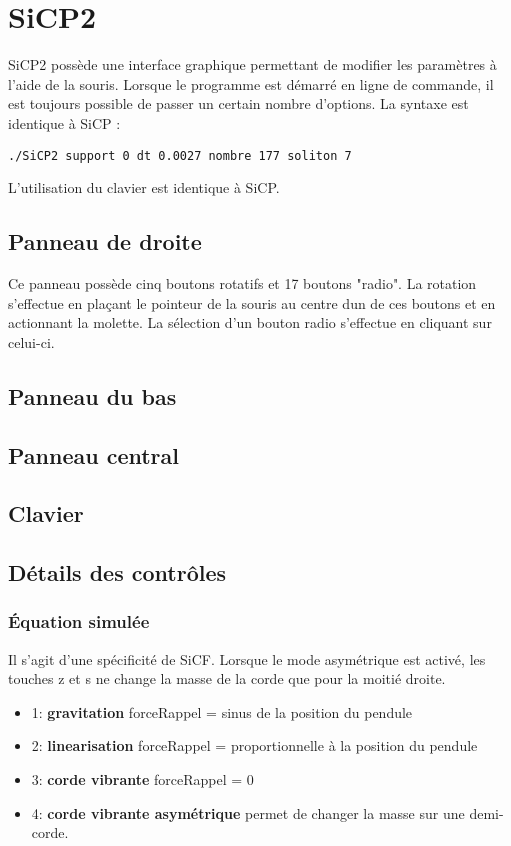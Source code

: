 %
\section{SiCP2}
%
%
SiCP2 possède une interface graphique permettant de modifier les paramètres à l'aide de la souris. Lorsque le programme est démarré en ligne de commande, il est toujours possible de passer un certain nombre d'options. La syntaxe est identique à SiCP :
\begin{center}
\texttt{./SiCP2 support 0 dt 0.0027 nombre 177 soliton 7}
\end{center}
L'utilisation du clavier est identique à SiCP.
%
%
%
\subsection{Panneau de droite}
%
Ce panneau possède cinq boutons rotatifs et 17 boutons "radio". La rotation s'effectue en plaçant le pointeur de la souris au centre dun de ces boutons et en actionnant la molette. La sélection d'un bouton radio s'effectue en cliquant sur celui-ci. 
%
%
%
\subsection{Panneau du bas}
%
%
%

%
%
%
\subsection{Panneau central}
%
%
%
%
\subsection{Clavier}
%
\footnotesize
\normalsize
%
\subsection{Détails des contrôles}
%
%
\subsubsection{Équation simulée}
%
Il s'agit d'une spécificité de SiCF. Lorsque le mode asymétrique est activé, les touches {\sf z} et {\sf s} ne change la masse de la corde que pour la moitié droite. 
%
\begin{itemize}[leftmargin=2cm, label=, itemsep=0pt]%
\item 1: {\bf gravitation} forceRappel = sinus de la position du pendule
\item 2: {\bf linearisation} forceRappel = proportionnelle à la position du pendule
\item 3: {\bf corde vibrante} forceRappel = 0
\item 4: {\bf corde vibrante asymétrique} permet de changer la masse sur une demi-corde.
\end{itemize}
%
